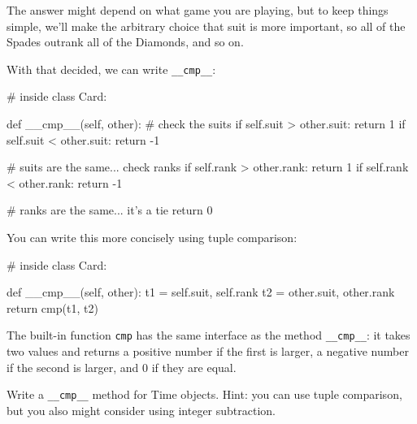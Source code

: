 The answer might depend on what game you are playing, but to keep
things simple, we'll make the arbitrary choice that suit is more
important, so all of the Spades outrank all of the Diamonds,
and so on.


With that decided, we can write \verb"__cmp__":

\beforeverb
\begin{pycode}
# inside class Card:

    def __cmp__(self, other):
        # check the suits
        if self.suit > other.suit: return 1
        if self.suit < other.suit: return -1

        # suits are the same... check ranks
        if self.rank > other.rank: return 1
        if self.rank < other.rank: return -1

        # ranks are the same... it's a tie
        return 0    
\end{pycode}
\afterverb
%
You can write this more concisely using tuple comparison:


\beforeverb
\begin{pycode}
# inside class Card:

    def __cmp__(self, other):
        t1 = self.suit, self.rank
        t2 = other.suit, other.rank
        return cmp(t1, t2)
\end{pycode}
\afterverb
%
The built-in function {\tt cmp} has the same interface as
the method \verb"__cmp__": it takes two values and returns
a positive number if the first is larger, a negative number
if the second is larger, and 0 if they are equal.



\begin{exercise}
Write a \verb"__cmp__" method for Time objects.  Hint: you
can use tuple comparison, but you also might consider using
integer subtraction.



\end{exercise}


